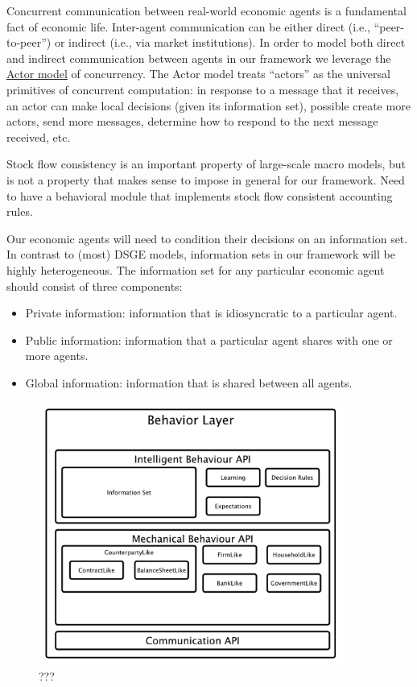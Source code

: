 \documentclass[11pt]{amsart}
\begin{document}
Concurrent communication between real-world economic agents is a fundamental fact of economic life. Inter-agent communication can be either direct (i.e., ``peer-to-peer'') or indirect (i.e., via market institutions). In order to model both direct and indirect communication between agents in our framework we leverage the \href{https://en.wikipedia.org/wiki/Actor_model}{Actor model} of concurrency. The Actor model treats ``actors'' as the universal primitives of concurrent computation: in response to a message that it receives, an actor can make local decisions (given its information set), possible create more actors, send more messages, determine how to respond to the next message received, etc.

Stock flow consistency is an important property of large-scale macro models, but is not a property that makes sense to impose in general for our framework.  Need to have a behavioral module that implements stock flow consistent accounting rules.

Our economic agents will need to condition their decisions on an information set.  In contrast to (most) DSGE models, information sets in our framework will be highly heterogeneous. The information set for any particular economic agent should consist of three components:
\begin{itemize}
    \item Private information: information that is idiosyncratic to a particular agent. 
    \item Public information: information that a particular agent shares with one or more agents.
    \item Global information: information that is shared between all agents.
\end{itemize}

\begin{figure}[H]
\centering
\includegraphics[width=10cm]{img/behavior-layer.pdf}
\caption{???}
\end{figure}
\end{document}
